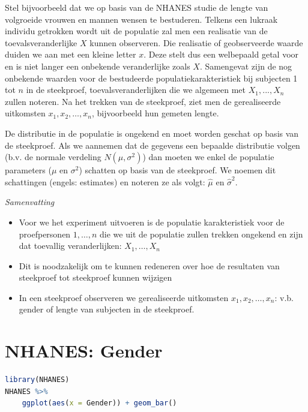 \documentclass[
  12pt,dutch,coursenotes]{book}
\begin{document}
Stel bijvoorbeeld dat we op basis van de NHANES studie de lengte van volgroeide vrouwen en mannen wensen te bestuderen.
Telkens een lukraak individu getrokken wordt uit de populatie zal men een
realisatie van de toevalsveranderlijke \(X\) kunnen observeren. Die realisatie
of geobserveerde waarde duiden we aan met een kleine letter \(x\). Deze stelt
dus een welbepaald getal voor en is niet langer een onbekende veranderlijke
zoals \(X\). Samengevat zijn de nog onbekende waarden voor de
bestudeerde populatiekarakteristiek bij subjecten 1 tot \(n\) in de
steekproef, toevalsveranderlijken die we algemeen met \(X_1,...,X_n\)
zullen noteren. Na het trekken van de steekproef, ziet men de gerealiseerde
uitkomsten \(x_1, x_2, \dots, x_n\), bijvoorbeeld hun gemeten lengte.

De distributie in de populatie is ongekend en moet worden geschat op basis van de steekproef. Als we aannemen dat de gegevens een bepaalde distributie volgen (b.v. de normale verdeling \(N(\mu,\sigma^2)\)) dan moeten we enkel de populatie parameters (\(\mu\) en \(\sigma^2\)) schatten op basis van de steekproef. We noemen dit schattingen (engels: estimates) en noteren ze als volgt: \(\hat \mu\) en \(\hat \sigma^2\).

\emph{Samenvatting}

\begin{itemize}
\item
  Voor we het experiment uitvoeren is de populatie karakteristiek voor de proefpersonen \(1,\ldots,n\) die we uit de populatie zullen trekken ongekend en zijn dat toevallig veranderlijken: \(X_1, \ldots, X_n\)
\item
  Dit is noodzakelijk om te kunnen redeneren over hoe de resultaten van steekproef tot steekproef kunnen wijzigen
\item
  In een steekproef observeren we gerealiseerde uitkomsten \(x_1, x_2, \dots, x_n\): v.b. gender of lengte van subjecten in de steekproef.
\end{itemize}

\hypertarget{nhanes-gender}{%
\section{NHANES: Gender}\label{nhanes-gender}}

\begin{lstlisting}[language=R]
library(NHANES)
NHANES %>%
    ggplot(aes(x = Gender)) + geom_bar()
\end{lstlisting}
\end{document}
